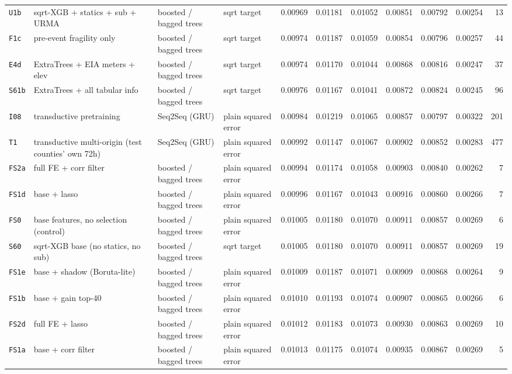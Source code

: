 \documentclass[9pt,landscape]{article}
\begin{document}
\begin{longtable}{@{}p{1.1cm}p{5.4cm}p{3.1cm}p{2.7cm}rrrrrrr@{}}
\texttt{U1b} & sqrt-XGB + statics + sub + URMA & boosted / bagged trees & sqrt target & 0.00969 & 0.01181 & 0.01052 & 0.00851 & 0.00792 & 0.00254 & 13 \\
\texttt{F1c} & pre-event fragility only & boosted / bagged trees & sqrt target & 0.00974 & 0.01187 & 0.01059 & 0.00854 & 0.00796 & 0.00257 & 44 \\
\texttt{E4d} & ExtraTrees + EIA meters + elev & boosted / bagged trees & sqrt target & 0.00974 & 0.01170 & 0.01044 & 0.00868 & 0.00816 & 0.00247 & 37 \\
\texttt{S61b} & ExtraTrees + all tabular info & boosted / bagged trees & sqrt target & 0.00976 & 0.01167 & 0.01041 & 0.00872 & 0.00824 & 0.00245 & 96 \\
\texttt{I08} & transductive pretraining & Seq2Seq (GRU) & plain squared error & 0.00984 & 0.01219 & 0.01065 & 0.00857 & 0.00797 & 0.00322 & 201 \\
\texttt{T1} & transductive multi-origin (test counties' own 72h) & Seq2Seq (GRU) & plain squared error & 0.00992 & 0.01147 & 0.01067 & 0.00902 & 0.00852 & 0.00283 & 477 \\
\texttt{FS2a} & full FE + corr filter & boosted / bagged trees & plain squared error & 0.00994 & 0.01174 & 0.01058 & 0.00903 & 0.00840 & 0.00262 & 7 \\
\texttt{FS1d} & base + lasso & boosted / bagged trees & plain squared error & 0.00996 & 0.01167 & 0.01043 & 0.00916 & 0.00860 & 0.00266 & 7 \\
\texttt{FS0} & base features, no selection (control) & boosted / bagged trees & plain squared error & 0.01005 & 0.01180 & 0.01070 & 0.00911 & 0.00857 & 0.00269 & 6 \\
\texttt{S60} & sqrt-XGB base (no statics, no sub) & boosted / bagged trees & sqrt target & 0.01005 & 0.01180 & 0.01070 & 0.00911 & 0.00857 & 0.00269 & 19 \\
\texttt{FS1e} & base + shadow (Boruta-lite) & boosted / bagged trees & plain squared error & 0.01009 & 0.01187 & 0.01071 & 0.00909 & 0.00868 & 0.00264 & 9 \\
\texttt{FS1b} & base + gain top-40 & boosted / bagged trees & plain squared error & 0.01010 & 0.01193 & 0.01074 & 0.00907 & 0.00865 & 0.00266 & 6 \\
\texttt{FS2d} & full FE + lasso & boosted / bagged trees & plain squared error & 0.01012 & 0.01183 & 0.01073 & 0.00930 & 0.00863 & 0.00269 & 10 \\
\texttt{FS1a} & base + corr filter & boosted / bagged trees & plain squared error & 0.01013 & 0.01175 & 0.01074 & 0.00935 & 0.00867 & 0.00269 & 5 \\

\end{longtable}
\end{document}
